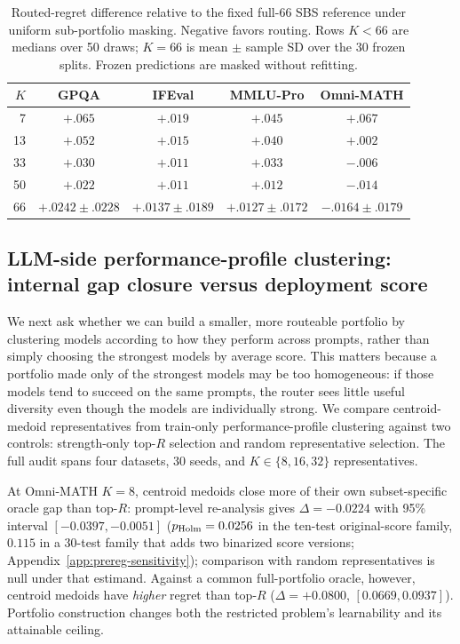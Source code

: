 \documentclass{article}
\begin{document}
\begin{table}[t]
  \caption{Routed-regret difference relative to the fixed full-66 SBS reference under uniform sub-portfolio masking. Negative favors routing. Rows $K<66$ are medians over 50 draws; $K=66$ is mean $\pm$ sample SD over the 30 frozen splits. Frozen predictions are masked without refitting.}
  \label{tab:portfolio-size}
  \centering
  \small
  \begin{tabular}{rcccc}
    \toprule
    $K$ & GPQA & IFEval & MMLU-Pro & Omni-MATH \\
    \midrule
    7 & $+.065$ & $+.019$ & $+.045$ & $+.067$ \\
    13 & $+.052$ & $+.015$ & $+.040$ & $+.002$ \\
    33 & $+.030$ & $+.011$ & $+.033$ & $-.006$ \\
    50 & $+.022$ & $+.011$ & $+.012$ & $-.014$ \\
    66 & $+.0242\pm.0228$ & $+.0137\pm.0189$ & $+.0127\pm.0172$ & $-.0164\pm.0179$ \\
    \bottomrule
  \end{tabular}
\end{table}

\subsection{LLM-side performance-profile clustering: internal gap closure versus deployment score}
\label{sec:llm-cluster}

We next ask whether we can build a smaller, more routeable portfolio by clustering models according to how they perform across prompts, rather than simply choosing the strongest models by average score. This matters because a portfolio made only of the strongest models may be too homogeneous: if those models tend to succeed on the same prompts, the router sees little useful diversity even though the models are individually strong. We compare centroid-medoid representatives from train-only performance-profile clustering against two controls: strength-only top-$R$ selection and random representative selection. The full audit spans four datasets, 30 seeds, and $K\in\{8,16,32\}$ representatives.

At Omni-MATH $K=8$, centroid medoids close more of their own subset-specific oracle gap than top-$R$: prompt-level re-analysis gives $\Delta=-0.0224$ with 95\% interval $[-0.0397,-0.0051]$ ($p_{\rm Holm}=0.0256$ in the ten-test original-score family, $0.115$ in a 30-test family that adds two binarized score versions; Appendix~\ref{app:prereg-sensitivity}); comparison with random representatives is null under that estimand. Against a common full-portfolio oracle, however, centroid medoids have \emph{higher} regret than top-$R$ ($\Delta=+0.0800$, $[0.0669,0.0937]$). Portfolio construction changes both the restricted problem's learnability and its attainable ceiling.
\end{document}
